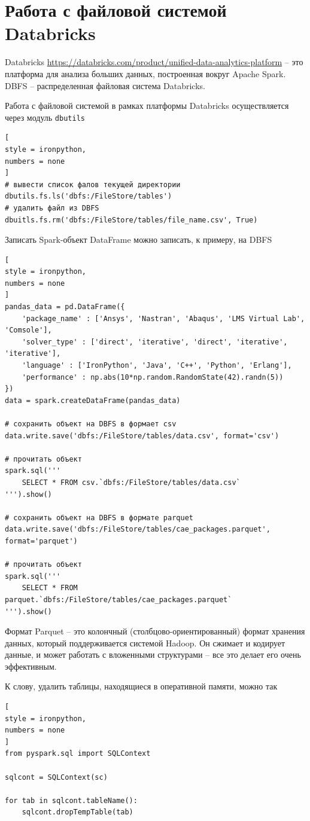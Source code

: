 \documentclass[%
	11pt,
	a4paper,
	utf8,
		]{article}
\begin{document}
\section{Работа с файловой системой Databricks}

Databricks \url{https://databricks.com/product/unified-data-analytics-platform} -- это платформа для анализа больших данных, построенная вокруг Apache Spark. DBFS -- распределенная файловая система Databricks.

Работа с файловой системой в рамках платформы Databricks осуществляется через модуль \texttt{dbutils}
\begin{lstlisting}[
style = ironpython,
numbers = none
]
# вывести список фалов текущей директории
dbutils.fs.ls('dbfs:/FileStore/tables')
# удалить файл из DBFS
dbuitls.fs.rm('dbfs:/FileStore/tables/file_name.csv', True)
\end{lstlisting} 

Записать Spark-объект DataFrame можно записать, к примеру, на DBFS
\begin{lstlisting}[
style = ironpython,
numbers = none
]
pandas_data = pd.DataFrame({
    'package_name' : ['Ansys', 'Nastran', 'Abaqus', 'LMS Virtual Lab', 'Comsole'],
    'solver_type' : ['direct', 'iterative', 'direct', 'iterative', 'iterative'],
    'language' : ['IronPython', 'Java', 'C++', 'Python', 'Erlang'],
    'performance' : np.abs(10*np.random.RandomState(42).randn(5))
})
data = spark.createDataFrame(pandas_data)

# сохранить объект на DBFS в формает csv
data.write.save('dbfs:/FileStore/tables/data.csv', format='csv')

# прочитать объект
spark.sql('''
    SELECT * FROM csv.`dbfs:/FileStore/tables/data.csv`
''').show()

# сохранить объект на DBFS в формате parquet
data.write.save('dbfs:/FileStore/tables/cae_packages.parquet', format='parquet')

# прочитать объект
spark.sql('''
    SELECT * FROM parquet.`dbfs:/FileStore/tables/cae_packages.parquet`
''').show()
\end{lstlisting}

Формат Parquet -- это колончный (столбцово-ориентированный) формат хранения данных, который поддерживается системой Hadoop. Он сжимает и кодирует данные, и может работать с вложенными структурами -- все это делает его очень эффективным.

К слову, удалить таблицы, находящиеся в оперативной памяти, можно так
\begin{lstlisting}[
style = ironpython,
numbers = none
]
from pyspark.sql import SQLContext

sqlcont = SQLContext(sc)

for tab in sqlcont.tableName():
    sqlcont.dropTempTable(tab)
\end{lstlisting}
\end{document}
